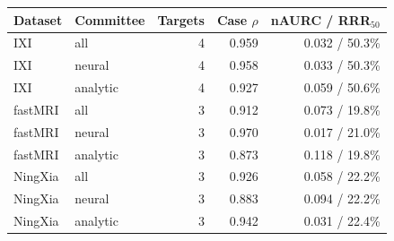 \begin{tabular}{llrrr}
\toprule
Dataset & Committee & Targets & Case $\rho$ & nAURC / RRR$_{50}$ \\
\midrule
IXI & all & 4 & 0.959 & 0.032 / 50.3\% \\
IXI & neural & 4 & 0.958 & 0.033 / 50.3\% \\
IXI & analytic & 4 & 0.927 & 0.059 / 50.6\% \\
fastMRI & all & 3 & 0.912 & 0.073 / 19.8\% \\
fastMRI & neural & 3 & 0.970 & 0.017 / 21.0\% \\
fastMRI & analytic & 3 & 0.873 & 0.118 / 19.8\% \\
NingXia & all & 3 & 0.926 & 0.058 / 22.2\% \\
NingXia & neural & 3 & 0.883 & 0.094 / 22.2\% \\
NingXia & analytic & 3 & 0.942 & 0.031 / 22.4\% \\
\bottomrule
\end{tabular}

